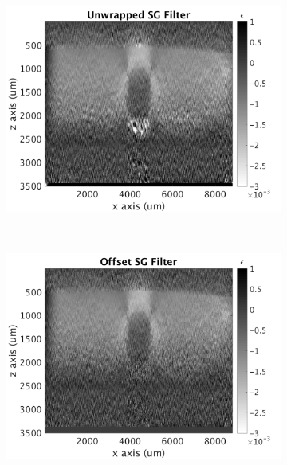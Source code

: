 \begin{figure}[h]
	\centering
    \begin{subfigure}{0.49\textwidth}
    	\centering
        \includegraphics[width=\textwidth{appendix_figs/wls_fr100_lr0.png}
    \end{subfigure}
    \begin{subfigure}{0.49\textwidth}
    	\centering
        \includegraphics[width=\textwidth]{appendix_figs/uwsg_fr100_lr0.png}
    \end{subfigure}
    \\
    \begin{subfigure}{0.49\textwidth}
    	\centering
        \includegraphics[width=\textwidth]{appendix_figs/posg_fr100_lr0.png}

\end{subfigure}
\end{figure}
